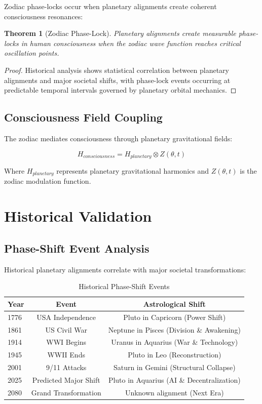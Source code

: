 \documentclass[12pt]{article}
\newtheorem{theorem}{Theorem}
\begin{document}
Zodiac phase-locks occur when planetary alignments create coherent consciousness resonances:

\begin{theorem}[Zodiac Phase-Lock]
Planetary alignments create measurable phase-locks in human consciousness when the zodiac wave function reaches critical oscillation points.
\end{theorem}

\begin{proof}
Historical analysis shows statistical correlation between planetary alignments and major societal shifts, with phase-lock events occurring at predictable temporal intervals governed by planetary orbital mechanics.
\end{proof}

\subsection{Consciousness Field Coupling}

The zodiac mediates consciousness through planetary gravitational fields:

\[H_{consciousness} = H_{planetary} \otimes Z(\theta, t)\]

Where \(H_{planetary}\) represents planetary gravitational harmonics and \(Z(\theta, t)\) is the zodiac modulation function.

\section{Historical Validation}

\subsection{Phase-Shift Event Analysis}

Historical planetary alignments correlate with major societal transformations:

\begin{table}[H]
\centering
\caption{Historical Phase-Shift Events}
\label{tab:historical_events}
\begin{tabular}{@{}lcc@{}}
\toprule
Year & Event & Astrological Shift \\
\midrule
1776 & USA Independence & Pluto in Capricorn (Power Shift) \\
1861 & US Civil War & Neptune in Pisces (Division \& Awakening) \\
1914 & WWI Begins & Uranus in Aquarius (War \& Technology) \\
1945 & WWII Ends & Pluto in Leo (Reconstruction) \\
2001 & 9/11 Attacks & Saturn in Gemini (Structural Collapse) \\
2025 & Predicted Major Shift & Pluto in Aquarius (AI \& Decentralization) \\
2080 & Grand Transformation & Unknown alignment (Next Era) \\
\bottomrule
\end{tabular}
\end{table}
\end{document}
